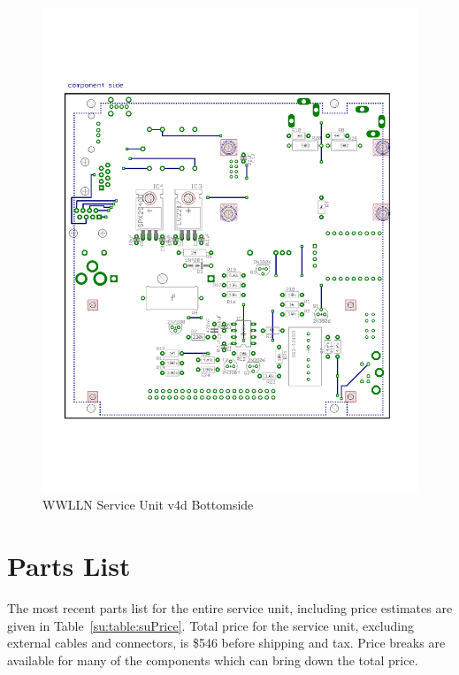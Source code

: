 \begin{figure}[ht!]
   \centering
   \includegraphics[scale=.75]{Appendix/Figures/wwlln_SU_v4_bottom.pdf} 
   \caption{WWLLN Service Unit v4d Bottomside}
   \label{su:fig:suBot}
\end{figure}

\section{Parts List}

The most recent parts list for the entire service unit, including price estimates are given in Table~\ref{su:table:suPrice}.
Total price for the service unit, excluding external cables and connectors, is \$546 before shipping and tax.
Price breaks are available for many of the components which can bring down the total price.

